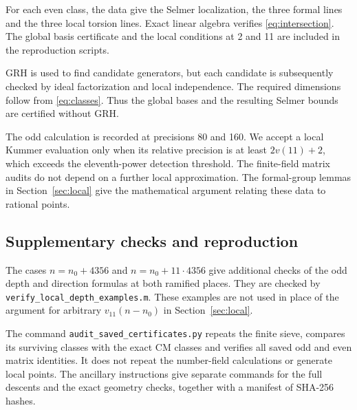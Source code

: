 \documentclass[11pt,reqno]{amsart}
\theoremstyle{definition}\newtheorem{definition}[theorem]{Definition}
\theoremstyle{remark}\newtheorem{remark}[theorem]{Remark}
\numberwithin{equation}{section}
\begin{document}
For each even class, the data give the Selmer localization, the
three formal lines and the three local torsion lines. Exact
linear algebra verifies \eqref{eq:intersection}. The global
basis certificate and the local conditions at 2 and 11 are
included in the reproduction scripts.

GRH is used to find candidate generators, but each candidate is
subsequently checked by ideal factorization and local
independence. The required dimensions follow from
\eqref{eq:classes}. Thus the global bases and the resulting
Selmer bounds are certified without GRH.

The odd calculation is recorded at precisions 80 and 160. We
accept a local Kummer evaluation only when its relative
precision is at least \(2v(11)+2\), which exceeds the
eleventh-power detection threshold. The finite-field matrix
audits do not depend on a further local approximation. The
formal-group lemmas in Section~\ref{sec:local} give the
mathematical argument relating these data to rational points.

\subsection{Supplementary checks and reproduction}
The cases \(n=n_0+4356\) and \(n=n_0+11\cdot4356\) give
additional checks of the odd depth and direction formulas at
both ramified places. They are checked by
\texttt{verify\_local\_depth\_examples.m}. These examples are
not used in place of the argument for arbitrary
\(v_{11}(n-n_0)\) in Section~\ref{sec:local}.

The command \texttt{audit\_saved\_certificates.py} repeats the
finite sieve, compares its surviving classes with the exact CM
classes and verifies all saved odd and even matrix identities.
It does not repeat the number-field calculations or generate
local points. The ancillary instructions give separate commands
for the full descents and the exact geometry checks, together
with a manifest of SHA-256 hashes.
\end{document}
